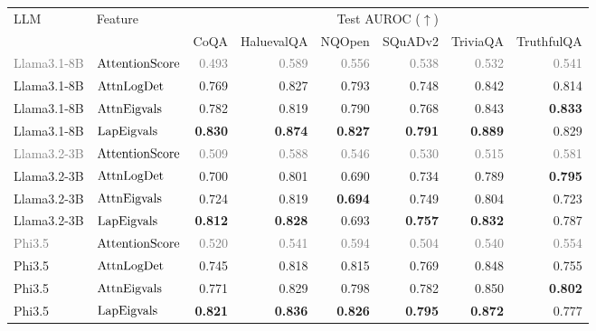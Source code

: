 \begin{tabular}{llrrrrrr}
\toprule
LLM & Feature & \multicolumn{6}{c}{Test AUROC ($\uparrow$)} \\
\cmidrule(lr){3-8}
& & CoQA & HaluevalQA & NQOpen & SQuADv2 & TriviaQA & TruthfulQA \\
\midrule
\textcolor{gray}{Llama3.1-8B} & \textcolor{gray}{$\operatorname{AttentionScore}$} & \textcolor{gray}{0.493} & \textcolor{gray}{0.589} & \textcolor{gray}{0.556} & \textcolor{gray}{0.538} & \textcolor{gray}{0.532} & \textcolor{gray}{0.541} \\
Llama3.1-8B & $\operatorname{AttnLogDet}$ & 0.769 & 0.827 & 0.793 & 0.748 & 0.842 & 0.814 \\
Llama3.1-8B & $\operatorname{AttnEigvals}$ & 0.782 & 0.819 & 0.790 & 0.768 & 0.843 & \textbf{0.833} \\
Llama3.1-8B & $\operatorname{LapEigvals}$ & \textbf{0.830} & \textbf{0.874} & \textbf{0.827} & \textbf{0.791} &\textbf{0.889} & 0.829 \\
\midrule
\textcolor{gray}{Llama3.2-3B} & \textcolor{gray}{$\operatorname{AttentionScore}$} & \textcolor{gray}{0.509} & \textcolor{gray}{0.588} & \textcolor{gray}{0.546} & \textcolor{gray}{0.530} & \textcolor{gray}{0.515} & \textcolor{gray}{0.581} \\
Llama3.2-3B & $\operatorname{AttnLogDet}$ & 0.700 & 0.801 & 0.690 & 0.734 & 0.789 & \textbf{0.795} \\
Llama3.2-3B & $\operatorname{AttnEigvals}$ & 0.724 & 0.819 & \textbf{0.694} & 0.749 & 0.804 & 0.723 \\
Llama3.2-3B & $\operatorname{LapEigvals}$ & \textbf{0.812} & \textbf{0.828} & 0.693 & \textbf{0.757} & \textbf{0.832} & 0.787 \\
\midrule
\textcolor{gray}{Phi3.5} & \textcolor{gray}{$\operatorname{AttentionScore}$} & \textcolor{gray}{0.520} & \textcolor{gray}{0.541} & \textcolor{gray}{0.594} & \textcolor{gray}{0.504} & \textcolor{gray}{0.540} & \textcolor{gray}{0.554} \\
Phi3.5 & $\operatorname{AttnLogDet}$ & 0.745 & 0.818 & 0.815 & 0.769 & 0.848 & 0.755 \\
Phi3.5 & $\operatorname{AttnEigvals}$ & 0.771 & 0.829 & 0.798 & 0.782 & 0.850 & \textbf{0.802} \\
Phi3.5 & $\operatorname{LapEigvals}$ & \textbf{0.821} & \textbf{0.836} & \textbf{0.826} &\textbf{ 0.795} & \textbf{0.872} & 0.777 \\
\bottomrule
\end{tabular}
